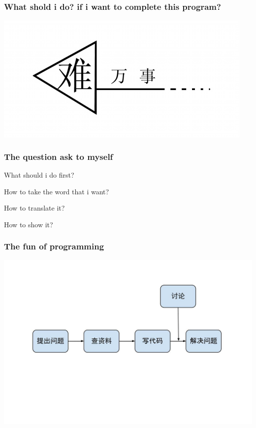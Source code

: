 \documentclass[10pt]{beamer}
\begin{document}
\begin{frame}
  \frametitle{What shold i do? if i want to complete this program?}
\begin{center} 
  \includegraphics[width=1.\textwidth]{myfirststep.jpg}

\end{center}

\end{frame}
\begin{frame}
  \frametitle{\Large{The question ask to myself}}
\begin{itemize}
 \LARGE{ \item What should i do first?
  \item How to take the word that i want?
  \item How to translate it?
  \item How to show it?}
\end{itemize}
\end{frame}

\begin{frame}
  \frametitle{\Large{The fun of programming}}
  
\begin{center} 
  \includegraphics[width=1.2\textwidth]{process.jpg}
  
\end{center}

\end{frame}
\end{document}
